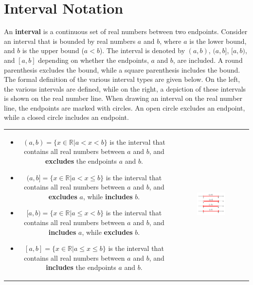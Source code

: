 \documentclass{article}
\begin{document}
\section*{Interval Notation}

An {\bf interval} is a continuous set of real numbers between two endpoints. Consider an interval that is bounded by real numbers \(a\) and \(b\), where \(a\) is the lower bound, and \(b\) is the upper bound (\(a < b\)). The interval is denoted by \((a, b)\), \((a, b]\), \([a, b)\), and \([a, b]\) depending on whether the endpoints, \(a\) and \(b\), are included. A round parenthesis excludes the bound, while a square parenthesis includes the bound. The formal definition of the various interval types are given below. On the left, the various intervals are defined, while on the right, a depiction of these intervals is shown on the real number line. When drawing an interval on the real number line, the endpoints are marked with circles. An open circle excludes an endpoint, while a closed circle includes an endpoint. 

\begin{tabular}{cc}
\parbox{0.5\textwidth}{
\begin{itemize}
\item \((a, b) = \{x \in \mathbb{R} | a < x < b\}\) is the interval that contains all real numbers between \(a\) and \(b\), and {\bf excludes} the endpoints \(a\) and \(b\).
\item \((a, b] = \{x \in \mathbb{R} | a < x \leq b\}\) is the interval that contains all real numbers between \(a\) and \(b\), and {\bf excludes} \(a\), while {\bf includes} \(b\).
\item \([a, b) = \{x \in \mathbb{R} | a \leq x < b\}\) is the interval that contains all real numbers between \(a\) and \(b\), and {\bf includes} \(a\), while {\bf excludes} \(b\).
\item \([a, b] = \{x \in \mathbb{R} | a \leq x \leq b\}\) is the interval that contains all real numbers between \(a\) and \(b\), and {\bf includes} the endpoints \(a\) and \(b\).
\end{itemize}
} & \parbox{0.4\textwidth}{
\includegraphics[width = 0.4\textwidth]{intervals}
}
\end{tabular}
\end{document}
